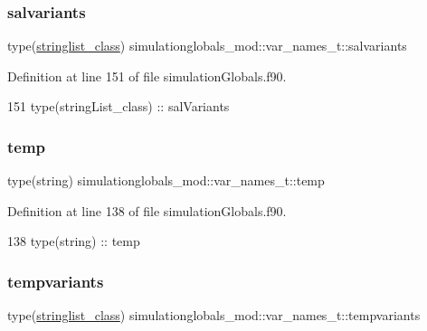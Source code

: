 \subsubsection{\texorpdfstring{salvariants}{salvariants}}
{\footnotesize\ttfamily type(\mbox{\hyperlink{structsimulationglobals__mod_1_1stringlist__class}{stringlist\+\_\+class}}) simulationglobals\+\_\+mod\+::var\+\_\+names\+\_\+t\+::salvariants\hspace{0.3cm}{\ttfamily [private]}}



Definition at line 151 of file simulation\+Globals.\+f90.


\begin{DoxyCode}
151         \textcolor{keywordtype}{type}(stringList\_class) :: salVariants
\end{DoxyCode}
\mbox{\label{structsimulationglobals__mod_1_1var__names__t_a2b8a91d6d50fa1312daa7b33447a1f23}} 
\subsubsection{\texorpdfstring{temp}{temp}}
{\footnotesize\ttfamily type(string) simulationglobals\+\_\+mod\+::var\+\_\+names\+\_\+t\+::temp\hspace{0.3cm}{\ttfamily [private]}}



Definition at line 138 of file simulation\+Globals.\+f90.


\begin{DoxyCode}
138         \textcolor{keywordtype}{type}(string) :: temp
\end{DoxyCode}
\mbox{\label{structsimulationglobals__mod_1_1var__names__t_ac8683baed9dc7b78e48128ebc1df9fe3}} 
\subsubsection{\texorpdfstring{tempvariants}{tempvariants}}
{\footnotesize\ttfamily type(\mbox{\hyperlink{structsimulationglobals__mod_1_1stringlist__class}{stringlist\+\_\+class}}) simulationglobals\+\_\+mod\+::var\+\_\+names\+\_\+t\+::tempvariants\hspace{0.3cm}{\ttfamily [private]}}



